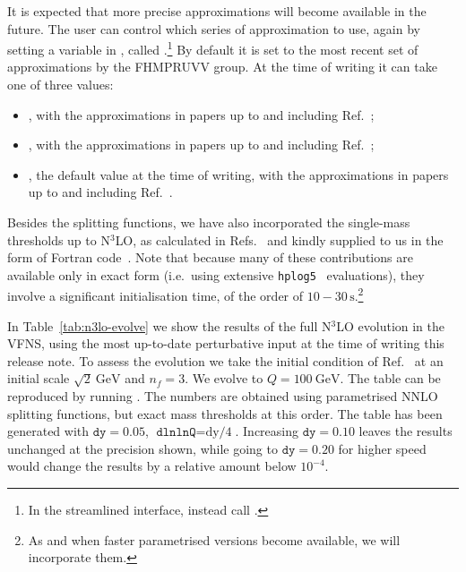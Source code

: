 It is expected that more precise approximations will become
available in the future.
%
The user can control which series of approximation to use, again by setting
a variable in , called
.\footnote{In the streamlined
  interface, instead call .}
%
By default it is set to the most recent set of approximations by
the FHMPRUVV group. At the time of writing it can take one of three values:
%
\begin{itemize}
\item {}, with the
  approximations in papers up to and including Ref.~\cite{Moch:2023tdj};
\item {}, with the
  approximations in papers up to and including
  Ref.~\cite{Falcioni:2024xyt};
\item {}, the default value at the time of
  writing, with the approximations in papers up to and including
  Ref.~\cite{Falcioni:2024qpd}.
\end{itemize}
Besides the splitting functions, we have also incorporated the
single-mass thresholds up to N$^3$LO, as calculated in
Refs.~\cite{Bierenbaum:2009mv,Ablinger:2010ty,Kawamura:2012cr,Blumlein:2012vq,ABLINGER2014263,Ablinger:2014nga,Ablinger:2014vwa,Behring:2014eya,Ablinger:2019etw,Behring:2021asx,Ablinger:2023ahe,Ablinger:2024xtt}
and kindly supplied to us in the form of Fortran
code~\cite{BlumleinCode,Fael:2022miw}.
%
Note that because many of these contributions are available only in
exact form (i.e.\ using extensive \texttt{hplog5}~\cite{FortranPolyLog} evaluations), they
involve a significant initialisation time, of the order of
$10{-}30\,\text{s}$.\footnote{As and when faster 
  parametrised versions become available, we will incorporate them.}

In Table~\ref{tab:n3lo-evolve} we show the results of the full N$^3$LO
evolution in the VFNS, using the most up-to-date perturbative input at
the time of writing this release note. To assess the evolution we take
the initial condition of Ref.~\cite{Dittmar:2005ed} at an initial
scale $\sqrt{2}~\text{GeV}$ and $n_f=3$. We evolve to
$Q=100~\text{GeV}$. The table can be reproduced by running
. The
numbers are obtained using parametrised NNLO splitting functions, but
exact mass thresholds at this order.
%
The table has been generated with $\texttt{dy}=0.05$,
$\texttt{dlnlnQ}=\text{dy/4}$.
%
Increasing $\texttt{dy}=0.10$ leaves the results unchanged at the
precision shown, while going to $\texttt{dy}=0.20$ for higher speed
would change the results by a relative amount below $10^{-4}$.

